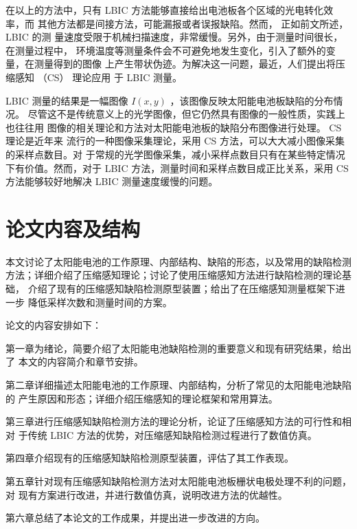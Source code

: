 在以上的方法中，只有 LBIC 方法能够直接给出电池板各个区域的光电转化效率，而
其他方法都是间接方法，可能漏报或者误报缺陷。然而， 正如前文所述， LBIC 的测
量速度受限于机械扫描速度，非常缓慢。另外，由于测量时间很长，在测量过程中，
环境温度等测量条件会不可避免地发生变化，引入了额外的变量，在测量得到的图像
上产生带状伪迹。为解决这一问题，最近，人们提出将压缩感知 （CS） 理论应用
于 LBIC 测量。\cite{CLBIC16} \cite{CLBIC17}

LBIC 测量的结果是一幅图像 $I(x,y)$ ，该图像反映太阳能电池板缺陷的分布情况。
尽管这不是传统意义上的光学图像，但它仍然具有图像的一般性质，实践上也往往用
图像的相关理论和方法对太阳能电池板的缺陷分布图像进行处理。 CS 理论是近年来
流行的一种图像采集理论，采用 CS 方法，可以大大减小图像采集的采样点数目。对
于常规的光学图像采集，减小采样点数目只有在某些特定情况下有价值。然而，对于
LBIC 方法，测量时间和采样点数目成正比关系，采用 CS 方法能够较好地解决 LBIC
测量速度缓慢的问题。

\section{论文内容及结构}

本文讨论了太阳能电池的工作原理、内部结构、缺陷的形态，以及常用的缺陷检测
方法；详细介绍了压缩感知理论；讨论了使用压缩感知方法进行缺陷检测的理论基础，
介绍了现有的压缩感知缺陷检测原型装置；给出了在压缩感知测量框架下进一步
降低采样次数和测量时间的方案。

论文的内容安排如下：

第一章为绪论，简要介绍了太阳能电池缺陷检测的重要意义和现有研究结果，给出了
本文的内容简介和章节安排。

第二章详细描述太阳能电池的工作原理、内部结构，分析了常见的太阳能电池缺陷的
产生原因和形态；详细介绍压缩感知的理论框架和常用算法。

第三章进行压缩感知缺陷检测方法的理论分析，论证了压缩感知方法的可行性和相对
于传统 LBIC 方法的优势，对压缩感知缺陷检测过程进行了数值仿真。

第四章介绍现有的压缩感知缺陷检测原型装置，评估了其工作表现。

第五章针对现有压缩感知缺陷检测方法对太阳能电池板栅状电极处理不利的问题，对
现有方案进行改进，并进行数值仿真，说明改进方法的优越性。

第六章总结了本论文的工作成果，并提出进一步改进的方向。
